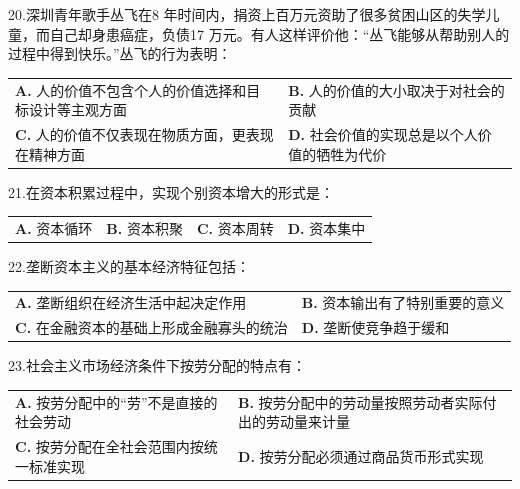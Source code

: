 \documentclass[UTF8,11pt]{ctexart}
\begin{document}
20.深圳青年歌手丛飞在8 年时间内，捐资上百万元资助了很多贫困山区的失学儿童，而自己却身患癌症，负债17 万元。有人这样评价他：“丛飞能够从帮助别人的过程中得到快乐。”丛飞的行为表明：


\begin{center}\begin{tabular}{>{\raggedright\arraybackslash}p{\dimexpr(\linewidth-4\tabcolsep)/2\relax}>{\raggedright\arraybackslash}p{\dimexpr(\linewidth-4\tabcolsep)/2\relax}}
\textbf{A.} 人的价值不包含个人的价值选择和目标设计等主观方面 & \textbf{B.} 人的价值的大小取决于对社会的贡献\\[.35em]
\textbf{C.} 人的价值不仅表现在物质方面，更表现在精神方面 & \textbf{D.} 社会价值的实现总是以个人价值的牺牲为代价\\[.35em]\end{tabular}\end{center}

21.在资本积累过程中，实现个别资本增大的形式是：


\begin{center}\begin{tabular}{>{\raggedright\arraybackslash}p{\dimexpr(\linewidth-8\tabcolsep)/4\relax}>{\raggedright\arraybackslash}p{\dimexpr(\linewidth-8\tabcolsep)/4\relax}>{\raggedright\arraybackslash}p{\dimexpr(\linewidth-8\tabcolsep)/4\relax}>{\raggedright\arraybackslash}p{\dimexpr(\linewidth-8\tabcolsep)/4\relax}}
\textbf{A.} 资本循环 & \textbf{B.} 资本积聚 & \textbf{C.} 资本周转 & \textbf{D.} 资本集中\\[.35em]\end{tabular}\end{center}

22.垄断资本主义的基本经济特征包括：


\begin{center}\begin{tabular}{>{\raggedright\arraybackslash}p{\dimexpr(\linewidth-4\tabcolsep)/2\relax}>{\raggedright\arraybackslash}p{\dimexpr(\linewidth-4\tabcolsep)/2\relax}}
\textbf{A.} 垄断组织在经济生活中起决定作用 & \textbf{B.} 资本输出有了特别重要的意义\\[.35em]
\textbf{C.} 在金融资本的基础上形成金融寡头的统治 & \textbf{D.} 垄断使竞争趋于缓和\\[.35em]\end{tabular}\end{center}

23.社会主义市场经济条件下按劳分配的特点有：


\begin{center}\begin{tabular}{>{\raggedright\arraybackslash}p{\dimexpr(\linewidth-4\tabcolsep)/2\relax}>{\raggedright\arraybackslash}p{\dimexpr(\linewidth-4\tabcolsep)/2\relax}}
\textbf{A.} 按劳分配中的“劳”不是直接的社会劳动 & \textbf{B.} 按劳分配中的劳动量按照劳动者实际付出的劳动量来计量\\[.35em]
\textbf{C.} 按劳分配在全社会范围内按统一标准实现 & \textbf{D.} 按劳分配必须通过商品货币形式实现\\[.35em]\end{tabular}\end{center}
\end{document}
